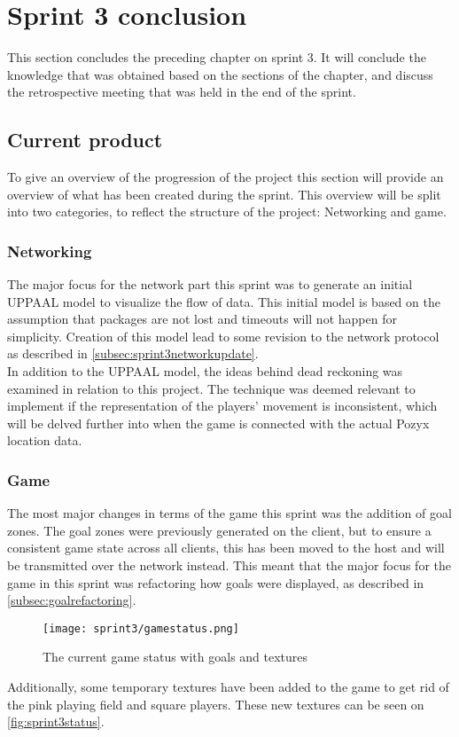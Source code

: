 \section{Sprint 3 conclusion}\label{sec:sprint3conclusion}
This section concludes the preceding chapter on sprint 3.
It will conclude the knowledge that was obtained based on the sections of the chapter, and discuss the retrospective meeting that was held in the end of the sprint.

\subsection{Current product}
To give an overview of the progression of the project this section will provide an overview of what has been created during the sprint.
This overview will be split into two categories, to reflect the structure of the project: Networking and game.

\subsubsection{Networking}
The major focus for the network part this sprint was to generate an initial UPPAAL model to visualize the flow of data.
This initial model is based on the assumption that packages are not lost and timeouts will not happen for simplicity.
Creation of this model lead to some revision to the network protocol as described in \autoref{subsec:sprint3networkupdate}.\\
In addition to the UPPAAL model, the ideas behind dead reckoning was examined in relation to this project.
The technique was deemed relevant to implement if the representation of the players' movement is inconsistent, which will be delved further into when the game is connected with the actual Pozyx location data.

\subsubsection{Game}
The most major changes in terms of the game this sprint was the addition of goal zones.
The goal zones were previously generated on the client, but to ensure a consistent game state across all clients, this has been moved to the host and will be transmitted over the network instead.
This meant that the major focus for the game in this sprint was refactoring how goals were displayed, as described in \ref{subsec:goalrefactoring}.

\begin{figure}[H]
	\centering
	\texttt{[image: sprint3/gamestatus.png]}
	\caption{The current game status with goals and textures}
	\label{fig:sprint3status}
\end{figure}
\noindent
Additionally, some temporary textures have been added to the game to get rid of the pink playing field and square players.
These new textures can be seen on \autoref{fig:sprint3status}.

